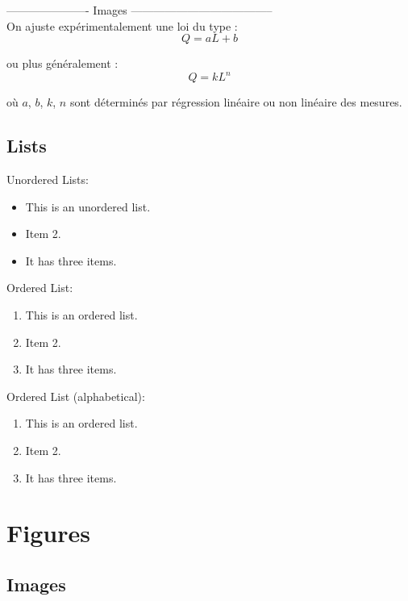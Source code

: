 	---------------------- Images -------------------------------------- \\
	
	On ajuste expérimentalement une loi du type :
	\begin{equation}
		Q = a L + b
	\end{equation}
	
	ou plus généralement :
	\begin{equation}
		Q = k L^n
	\end{equation}
	
	où $a$, $b$, $k$, $n$ sont déterminés par régression linéaire ou non linéaire des mesures.
	

		
	
\pagebreak

\section{Lists}

Unordered Lists:
\begin{itemize}
\item This is an unordered list. 
\item Item 2.
\item It has three items.
\end{itemize}

Ordered List:
\begin{enumerate}
\item This is an ordered list.
\item Item 2.
\item It has three items.
\end{enumerate}

Ordered List (alphabetical):
\begin{enumerate}[label=\Alph*.]
\item This is an ordered list.
\item Item 2.
\item It has three items.
\end{enumerate}

\chapter{Figures}\label{ch:figures}

\section{Images}\label{sec:images}

